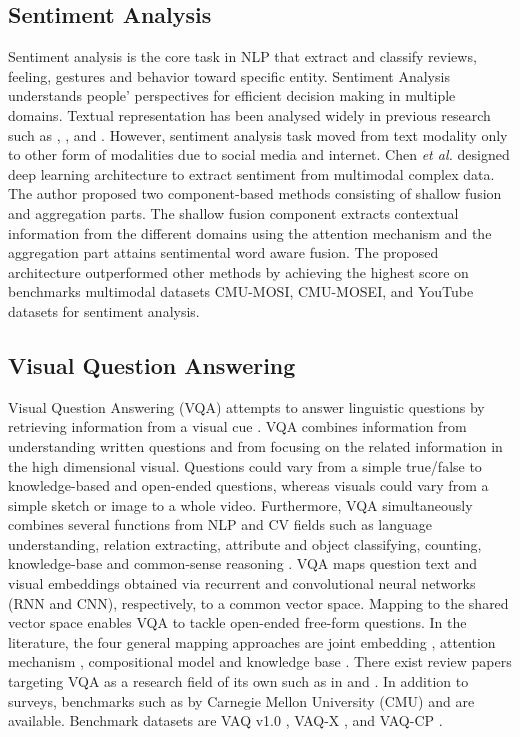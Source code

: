\documentclass[conference]{IEEEtran}
\begin{document}
\subsection{Sentiment Analysis}
Sentiment analysis is the core task in NLP that extract and classify reviews, feeling, gestures and behavior toward specific entity. Sentiment Analysis understands people' perspectives for efficient decision making in multiple domains. Textual representation has been analysed widely in previous research such as \cite{kim2016topic}, \cite{camacho2017role}, and \cite{wood2021market}. However, sentiment analysis task moved from text modality only to other form of modalities due to social media and internet. Chen \textit{et al.} \cite{chen2020swafn} designed deep learning architecture to extract sentiment from multimodal complex data. The author proposed two component-based methods consisting of shallow fusion and aggregation parts. The shallow fusion component extracts contextual information from the different domains using the attention mechanism and the aggregation part attains sentimental word aware fusion. The proposed architecture outperformed other methods by achieving the highest score on benchmarks multimodal datasets CMU-MOSI, CMU-MOSEI, and YouTube datasets for sentiment analysis. 



\subsection{Visual Question Answering}
Visual Question Answering (VQA) attempts to answer linguistic questions by retrieving information from a visual cue \cite{VQA}. VQA combines information from understanding written questions and from focusing on the related information in the high dimensional visual. Questions could vary from a simple true/false to knowledge-based and open-ended questions, whereas visuals could vary from a simple sketch or image to a whole video. Furthermore, VQA simultaneously combines several functions from NLP and CV fields such as language understanding, relation extracting, attribute and object classifying, counting, knowledge-base and common-sense reasoning \cite{recent_paper}.  
VQA maps question text and visual embeddings obtained via recurrent and convolutional neural networks (RNN and CNN), respectively, to a common vector space. Mapping to the shared vector space enables VQA to tackle open-ended free-form questions. In the literature, the four general mapping approaches are joint embedding \cite{vqa_emb}, attention mechanism \cite{vqa_att}, compositional model \cite{vqa_comp} and knowledge base \cite{vqa_kb}.     
There exist review papers targeting VQA as a research field of its own such as in \cite{VQA} and \cite{VQA2}. In addition to surveys, benchmarks such as \cite{bench1} by Carnegie Mellon University (CMU) and \cite{bench2} are available. Benchmark datasets are VAQ v1.0 \cite{VQA2}, VAQ-X \cite{vqa-x}, and VAQ-CP \cite{vqa-cp}.    
\end{document}
